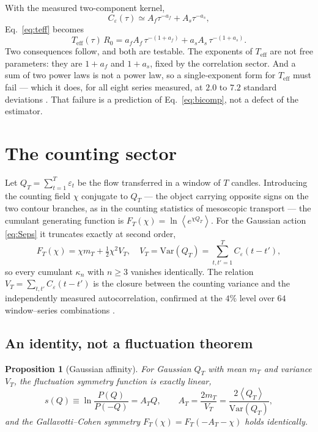 \documentclass[aps,pre,twocolumn,superscriptaddress,floatfix,nofootinbib]{revtex4-2}
\newcommand{\eps}{\varepsilon}
\newcommand{\avg}[1]{\left\langle #1 \right\rangle}
\newcommand{\Teff}{T_{\mathrm{eff}}}
\newcommand{\Var}{\mathrm{Var}}
\newtheorem{proposition}{Proposition}
\begin{document}
With the measured two-component kernel,
\begin{equation}
  C_\eps(\tau)\simeq A_f\tau^{-a_f}+A_s\tau^{-a_s} ,
  \label{eq:bicomp}
\end{equation}
Eq.~\eqref{eq:teff} becomes
\begin{equation}
  \Teff(\tau)\,R_0=a_fA_f\,\tau^{-(1+a_f)}+a_sA_s\,\tau^{-(1+a_s)} .
  \label{eq:teff2}
\end{equation}
Two consequences follow, and both are testable. The exponents of $\Teff$ are not
free parameters: they are $1+a_f$ and $1+a_s$, fixed by the correlation sector.
And a sum of two power laws is not a power law, so a single-exponent form for
$\Teff$ must fail --- which it does, for all eight series measured, at $2.0$ to
$7.2$ standard deviations \cite{paper1}. That failure is a prediction of
Eq.~\eqref{eq:bicomp}, not a defect of the estimator.

\section{The counting sector}
\label{sec:counting}

Let $Q_T=\sum_{t=1}^{T}\eps_t$ be the flow transferred in a window of $T$
candles. Introducing the counting field $\chi$ conjugate to $Q_T$ --- the object
carrying opposite signs on the two contour branches, as in the counting
statistics of mesoscopic transport
\cite{levitov1993,levitov1996,schoenhammer2007,esposito2009} --- the cumulant
generating function is $F_T(\chi)=\ln\avg{e^{\chi Q_T}}$. For the Gaussian
action \eqref{eq:Seps} it truncates exactly at second order,
\begin{equation}
  F_T(\chi)=\chi m_T+\tfrac12\chi^2V_T ,
  \quad
  V_T=\Var(Q_T)=\!\!\sum_{t,t'=1}^{T}\!\!C_\eps(t-t') ,
  \label{eq:cgf}
\end{equation}
so every cumulant $\kappa_n$ with $n\ge3$ vanishes identically. The relation
$V_T=\sum_{t,t'}C_\eps(t-t')$ is the closure between the counting variance and
the independently measured autocorrelation, confirmed at the $4\%$ level over
$64$ window--series combinations \cite{paper1}.

\subsection{An identity, not a fluctuation theorem}
\label{sec:identity}

\begin{proposition}[Gaussian affinity]
\label{prop:affinity}
For Gaussian $Q_T$ with mean $m_T$ and variance $V_T$, the fluctuation symmetry
function is exactly linear,
\begin{equation}
  s(Q)\equiv\ln\frac{P(Q)}{P(-Q)}=A_TQ ,
  \qquad A_T=\frac{2m_T}{V_T}=\frac{2\avg{Q_T}}{\Var(Q_T)} ,
\end{equation}
and the Gallavotti--Cohen symmetry $F_T(\chi)=F_T(-A_T-\chi)$ holds identically.
\end{proposition}
\end{document}
